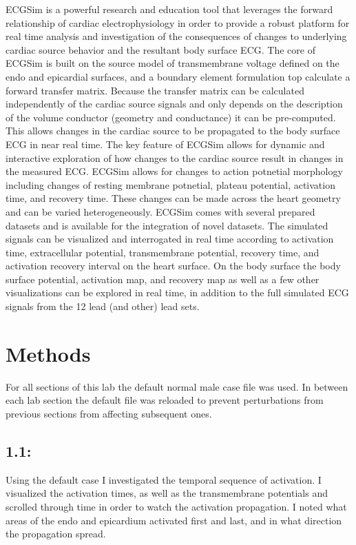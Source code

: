 \documentclass[12pt]{article}
\begin{document}
ECGSim is a powerful research and education tool that leverages the forward relationship of cardiac electrophysiology in order to provide a robust platform for real time analysis and investigation of the consequences of changes to underlying cardiac source behavior and the resultant body surface ECG. The core of ECGSim is built on the source model of transmembrane voltage defined on the endo and epicardial surfaces, and a boundary element formulation top calculate a forward transfer matrix. Because the transfer matrix can be calculated independently of the cardiac source signals and only depends on the description of the volume conductor (geometry and conductance) it can be pre-computed. This allows changes in the cardiac source to be propagated to the body surface ECG in near real time. The key feature of ECGSim allows for dynamic and interactive exploration of how changes to the cardiac source result in changes in the measured ECG. ECGSim allows for changes to action potnetial morphology including changes of resting membrane potnetial, plateau potential, activation time, and recovery time. These changes can be made across the heart geometry and can be varied heterogeneously. ECGSim comes with several prepared datasets and is available for the integration of novel datasets. The simulated signals can be visualized and interrogated in real time according to activation time, extracellular potential, transmembrane potential, recovery time, and activation recovery interval on the heart surface. On the body surface the body surface potential, activation map, and recovery map as well as a few other visualizations can be explored in real time, in addition to the full simulated ECG signals from the 12 lead (and other) lead sets.

\section{Methods}
For all sections of this lab the default normal male case file was used. In between each lab section the default file was reloaded to prevent perturbations from previous sections from affecting subsequent ones.

\subsection{1.1: }
Using the default case I investigated the temporal sequence of activation. I visualized the activation times, as well as the transmembrane potentials and scrolled through time in order to watch the activation propagation. I noted what areas of the endo and epicardium activated first and last, and in what direction the propagation spread.
\end{document}
